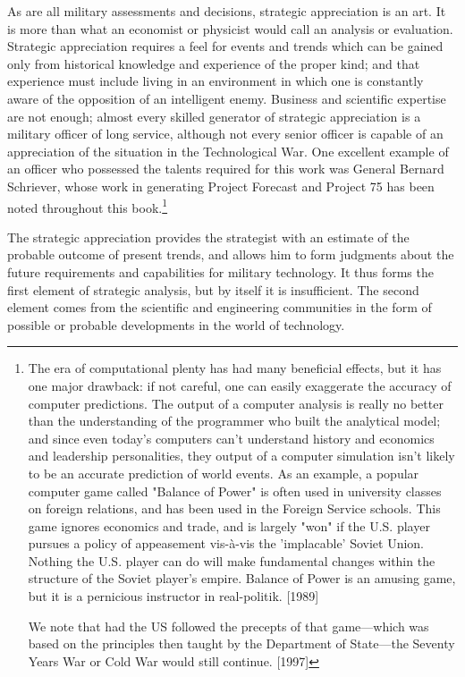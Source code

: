 As are all military assessments and decisions, strategic appreciation is an art. It is more than what an economist or physicist would call an analysis or evaluation. Strategic appreciation requires a feel for events and trends which can be gained only from historical knowledge and experience of the proper kind; and that experience must include living in an environment in which one is constantly aware of the opposition of an intelligent enemy. Business and scientific expertise are not enough; almost every skilled generator of strategic appreciation is a military officer of long service, although not every senior officer is capable of an appreciation of the situation in the Technological War. One excellent example of an officer who possessed the talents required for this work was General Bernard Schriever, whose work in generating Project Forecast and Project 75 has been noted throughout this book.\footnote{The era of computational plenty has had many beneficial effects, but it has one major drawback: if not careful, one can easily exaggerate the accuracy of computer predictions. The output of a computer analysis is really no better than the understanding of the programmer who built the analytical model; and since even today's computers can't understand history and economics and leadership personalities, they output of a computer simulation isn't likely to be an accurate prediction of world events. As an example, a popular computer game called "Balance of Power" is often used in university classes on foreign relations, and has been used in the Foreign Service schools. This game ignores economics and trade, and is largely "won" if the U.S. player pursues a policy of appeasement vis-à-vis the 'implacable' Soviet Union. Nothing the U.S. player can do will make fundamental changes within the structure of the Soviet player's empire. Balance of Power is an amusing game, but it is a pernicious instructor in real-politik. [1989]

We note that had the US followed the precepts of that game—which was based on the principles then taught by the Department of State—the Seventy Years War or Cold War would still continue. [1997]}

The strategic appreciation provides the strategist with an estimate of the probable outcome of present trends, and allows him to form judgments about the future requirements and capabilities for military technology. It thus forms the first element of strategic analysis, but by itself it is insufficient. The second element comes from the scientific and engineering communities in the form of possible or probable developments in the world of technology.

